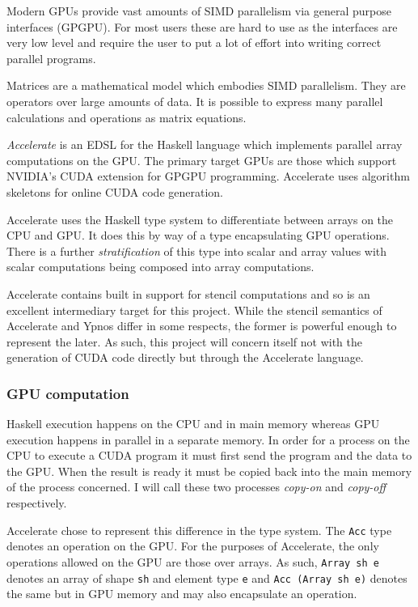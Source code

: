 Modern GPUs provide vast amounts of SIMD parallelism via general purpose
interfaces (GPGPU). For most users these are hard to use as the
interfaces are very low level and require the user to put a lot of
effort into writing correct parallel programs.

Matrices are a mathematical model which embodies SIMD parallelism. They
are operators over large amounts of data. It is possible to express many
parallel calculations and operations as matrix equations.

\emph{Accelerate} is an EDSL for the Haskell language which implements
parallel array computations on the GPU. The primary target GPUs are
those which support NVIDIA's CUDA extension for GPGPU programming.
Accelerate uses algorithm skeletons for online CUDA code generation.

Accelerate uses the Haskell type system to differentiate between arrays
on the CPU and GPU. It does this by way of a type encapsulating GPU
operations. There is a further \emph{stratification} of this type into
scalar and array values with scalar computations being composed into
array computations.

Accelerate contains built in support for stencil computations and so is
an excellent intermediary target for this project. While the stencil
semantics of Accelerate and Ypnos differ in some respects, the former is
powerful enough to represent the later. As such, this project will
concern itself not with the generation of CUDA code directly but through
the Accelerate language.

\subsubsection{GPU computation}

Haskell execution happens on the CPU and in main memory whereas GPU
execution happens in parallel in a separate memory. In order for a
process on the CPU to execute a CUDA program it must first send the
program and the data to the GPU. When the result is ready it must be
copied back into the main memory of the process concerned. I will call
these two processes \emph{copy-on} and \emph{copy-off} respectively.

Accelerate chose to represent this difference in the type system. The
\texttt{Acc} type denotes an operation on the GPU. For the purposes of
Accelerate, the only operations allowed on the GPU are those over
arrays. As such, \texttt{Array sh e} denotes an array of shape
\texttt{sh} and element type \texttt{e} and \texttt{Acc (Array sh e)}
denotes the same but in GPU memory and may also encapsulate an
operation.

